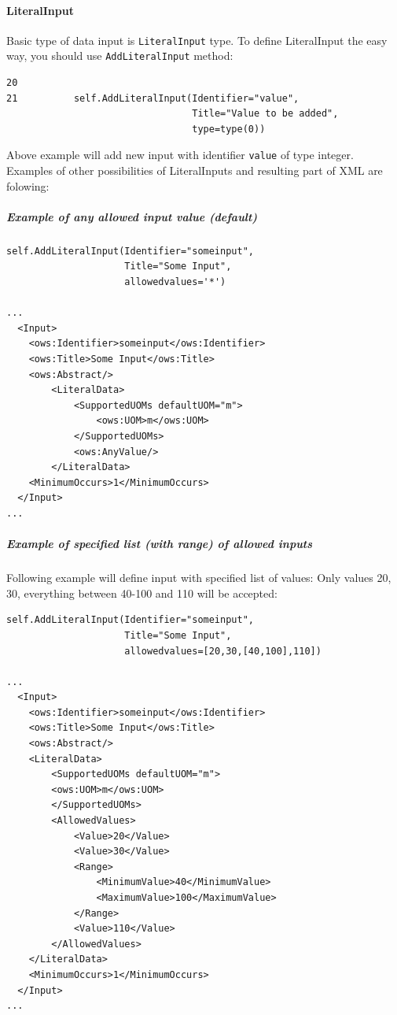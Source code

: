 \documentclass[a4paper,11pt]{article}
\begin{document}
\paragraph{LiteralInput}

Basic type of data input is \texttt{LiteralInput} type. To define
LiteralInput the easy way, you should use \texttt{AddLiteralInput} method:

\begin{verbatim}
20
21          self.AddLiteralInput(Identifier="value",
                                 Title="Value to be added",
                                 type=type(0))
\end{verbatim}

Above example will add new input with identifier \texttt{value} of type
integer. Examples of other possibilities of LiteralInputs and resulting
part of XML are folowing:

\subparagraph{Example of any allowed input value (default)}
\begin{verbatim}
self.AddLiteralInput(Identifier="someinput", 
                     Title="Some Input", 
                     allowedvalues='*')

...
  <Input>
    <ows:Identifier>someinput</ows:Identifier>
    <ows:Title>Some Input</ows:Title>
    <ows:Abstract/>
        <LiteralData>
            <SupportedUOMs defaultUOM="m">
                <ows:UOM>m</ows:UOM>
            </SupportedUOMs>
            <ows:AnyValue/>
        </LiteralData>
    <MinimumOccurs>1</MinimumOccurs>
  </Input>
...
\end{verbatim}

\subparagraph{Example of specified list (with range) of allowed inputs}

Following example will define input with specified list of values: Only
values 20, 30, everything between 40-100 and 110 will be accepted:
\begin{verbatim}
self.AddLiteralInput(Identifier="someinput",
                     Title="Some Input",
                     allowedvalues=[20,30,[40,100],110])

...
  <Input>
    <ows:Identifier>someinput</ows:Identifier>
    <ows:Title>Some Input</ows:Title>
    <ows:Abstract/>
    <LiteralData>
    	<SupportedUOMs defaultUOM="m">
        <ows:UOM>m</ows:UOM>
        </SupportedUOMs>
        <AllowedValues>
            <Value>20</Value>
            <Value>30</Value>
            <Range>
                <MinimumValue>40</MinimumValue>
                <MaximumValue>100</MaximumValue>
            </Range>
            <Value>110</Value>
        </AllowedValues>
    </LiteralData>
    <MinimumOccurs>1</MinimumOccurs>
  </Input>
...
\end{verbatim}
\end{document}
